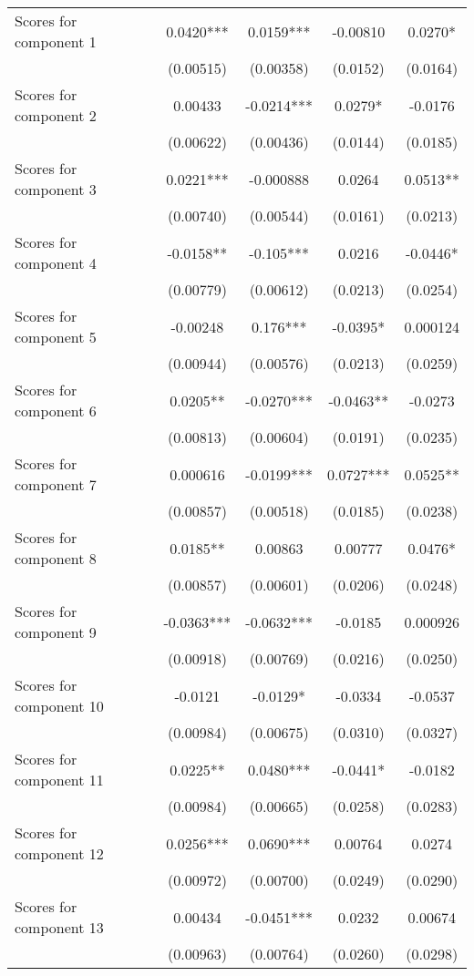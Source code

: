 \documentclass[]{article}
\begin{document}
\begin{tabular}{lcccc}
Scores for component 1 & 0.0420*** & 0.0159*** & -0.00810 & 0.0270* \\
 & (0.00515) & (0.00358) & (0.0152) & (0.0164) \\
Scores for component 2 & 0.00433 & -0.0214*** & 0.0279* & -0.0176 \\
 & (0.00622) & (0.00436) & (0.0144) & (0.0185) \\
Scores for component 3 & 0.0221*** & -0.000888 & 0.0264 & 0.0513** \\
 & (0.00740) & (0.00544) & (0.0161) & (0.0213) \\
Scores for component 4 & -0.0158** & -0.105*** & 0.0216 & -0.0446* \\
 & (0.00779) & (0.00612) & (0.0213) & (0.0254) \\
Scores for component 5 & -0.00248 & 0.176*** & -0.0395* & 0.000124 \\
 & (0.00944) & (0.00576) & (0.0213) & (0.0259) \\
Scores for component 6 & 0.0205** & -0.0270*** & -0.0463** & -0.0273 \\
 & (0.00813) & (0.00604) & (0.0191) & (0.0235) \\
Scores for component 7 & 0.000616 & -0.0199*** & 0.0727*** & 0.0525** \\
 & (0.00857) & (0.00518) & (0.0185) & (0.0238) \\
Scores for component 8 & 0.0185** & 0.00863 & 0.00777 & 0.0476* \\
 & (0.00857) & (0.00601) & (0.0206) & (0.0248) \\
Scores for component 9 & -0.0363*** & -0.0632*** & -0.0185 & 0.000926 \\
 & (0.00918) & (0.00769) & (0.0216) & (0.0250) \\
Scores for component 10 & -0.0121 & -0.0129* & -0.0334 & -0.0537 \\
 & (0.00984) & (0.00675) & (0.0310) & (0.0327) \\
Scores for component 11 & 0.0225** & 0.0480*** & -0.0441* & -0.0182 \\
 & (0.00984) & (0.00665) & (0.0258) & (0.0283) \\
Scores for component 12 & 0.0256*** & 0.0690*** & 0.00764 & 0.0274 \\
 & (0.00972) & (0.00700) & (0.0249) & (0.0290) \\
Scores for component 13 & 0.00434 & -0.0451*** & 0.0232 & 0.00674 \\
 & (0.00963) & (0.00764) & (0.0260) & (0.0298) \\

\end{tabular}
\end{document}
